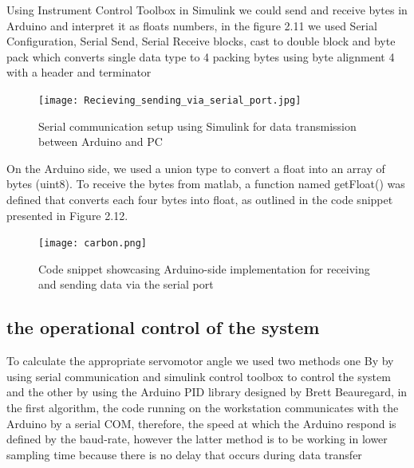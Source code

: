Using Instrument Control Toolbox in Simulink we could send and receive bytes in Arduino and interpret it as floats numbers, in the figure 2.11 we used Serial Configuration, Serial Send, Serial Receive blocks, cast to double block and byte pack which converts single data type to 4 packing bytes using byte alignment 4 with a header and terminator 
\begin{figure}[h!]
    \centering
    \texttt{[image: Recieving\_sending\_via\_serial\_port.jpg]}
    \caption{Serial communication setup using Simulink for data transmission between Arduino and PC}
\end{figure}

On the Arduino side, we used a union type to convert a float into an array of bytes (uint8). To receive the bytes from matlab, a function named getFloat()  was defined that converts each four bytes into float, as outlined in the code snippet presented in Figure 2.12.

\begin{figure}[h!]
    \centering
    \texttt{[image: carbon.png]}
    \caption{Code snippet showcasing Arduino-side implementation for receiving and sending data via the serial port}
\end{figure}

\subsection{the operational control of the system}
To calculate the appropriate servomotor angle we used two methods one By by using serial communication and simulink control toolbox to control the system and the other by using the Arduino PID library designed by Brett Beauregard, in the first algorithm, the code running on the workstation communicates with the Arduino by a serial COM, therefore, the speed at which the Arduino respond is defined by the baud-rate, however the latter method is to be working in lower sampling time because there is no delay that occurs during data transfer
